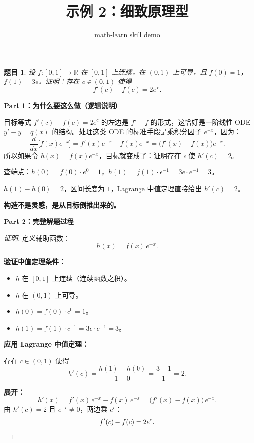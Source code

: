 \documentclass[12pt,a4paper]{ctexart}
\title{示例 2：细致原理型}
\author{math-learn skill demo}
\date{}
\theoremstyle{plain}
\newtheorem{problem}{题目}
\newenvironment{solution}{\begin{proof}[证明]}{\end{proof}}
\begin{document}
\maketitle

\noindent{}

\bigskip

\begin{problem}
设 $f:[0,1]\to\mathbb{R}$ 在 $[0,1]$ 上连续，在 $(0,1)$ 上可导，且 $f(0)=1$，$f(1)=3e$。证明：存在 $c\in(0,1)$ 使得
\[
  f'(c) - f(c) = 2e^{\,c}.
\]
\end{problem}

\bigskip
\noindent\textbf{Part 1：为什么要这么做（逻辑说明）}

\medskip
目标等式 $f'(c)-f(c)=2e^c$ 的左边是 $f'-f$ 的形式，这恰好是一阶线性 ODE $y'-y=q(x)$ 的结构。处理这类 ODE 的标准手段是乘积分因子 $e^{-x}$，因为：
\[
  \frac{d}{dx}\bigl[f(x)e^{-x}\bigr] = f'(x)e^{-x} - f(x)e^{-x} = \bigl(f'(x)-f(x)\bigr)e^{-x}.
\]
所以如果令 $h(x)=f(x)e^{-x}$，目标就变成了：证明存在 $c$ 使 $h'(c)=2$。

查端点：$h(0)=f(0)\cdot e^0=1$，$h(1)=f(1)\cdot e^{-1}=3e\cdot e^{-1}=3$。

$h(1)-h(0)=2$，区间长度为 $1$，Lagrange 中值定理直接给出 $h'(c)=2$。

\textbf{构造不是灵感，是从目标倒推出来的。}

\bigskip
\noindent\textbf{Part 2：完整解题过程}

\begin{solution}
定义辅助函数：
\[
  h(x) = f(x)\,e^{-x}.
\]

\textbf{验证中值定理条件：}
\begin{itemize}
  \item $h$ 在 $[0,1]$ 上连续（连续函数之积）。
  \item $h$ 在 $(0,1)$ 上可导。
  \item $h(0) = f(0)\cdot e^{0} = 1$。
  \item $h(1) = f(1)\cdot e^{-1} = 3e\cdot e^{-1} = 3$。
\end{itemize}

\textbf{应用 Lagrange 中值定理：}

存在 $c\in(0,1)$ 使得
\[
  h'(c) = \frac{h(1)-h(0)}{1-0} = \frac{3-1}{1} = 2.
\]

\textbf{展开：}
\[
  h'(x) = f'(x)\,e^{-x} - f(x)\,e^{-x} = \bigl(f'(x)-f(x)\bigr)\,e^{-x}.
\]
由 $h'(c)=2$ 且 $e^{-c}\neq 0$，两边乘 $e^c$：
\[
  f'(c)-f(c) = 2e^c. \qedhere
\]
\end{solution}
\end{document}
